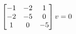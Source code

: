\documentclass[preview]{standalone}
\begin{document}
\begin{align*}
\special{dvisvgm:raw <g id='unique000'>}\begin{bmatrix}-1 & -2 & 1 \\-2 & -5 & 0 \\1 & 0 & -5\end{bmatrix} v = 0\special{dvisvgm:raw </g>}
\end{align*}
\end{document}
